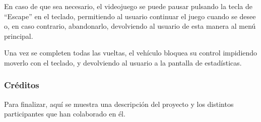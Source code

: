En caso de que sea necesario, el videojuego se puede pausar pulsando la tecla de ``Escape'' en el teclado, permitiendo al usuario continuar el juego cuando se desee o, en caso contrario, abandonarlo, devolviendo al usuario de esta manera al menú principal.


Una vez se completen todas las vueltas, el vehículo bloquea su control impidiendo moverlo con el teclado, y devolviendo al usuario a la pantalla de estadísticas.

\subsubsection{Créditos}

Para finalizar, aquí se muestra una descripción del proyecto y los distintos participantes que han colaborado en él.

